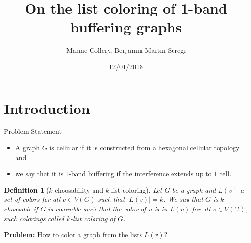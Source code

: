 \documentclass{beamer}
\title[Final Seminar]{On the list coloring of 1-band buffering graphs}
\author{Marine Collery, Benjamin Martin Seregi}
\institute{KTH Royal Institute of Technology\\
II2202, Fall 2017, Period 1-2}
\date{12/01/2018}
\newtheorem{defi}[lem]{Definition}
\begin{document}
\begin{frame}
  \titlepage
\end{frame}

\section{Introduction}

\begin{frame}{Problem Statement}

\justifying
\begin{itemize}
\item A graph $G$ is cellular if it is constructed from a hexagonal cellular topology and
\pause \item we say that it is $1$-band buffering if the interference extends up to $1$ cell.
\end{itemize}
\pause \begin{defi}[$k$-choosability and $k$-list coloring]
Let $G$ be a graph and $L(v)$ a set of colors for all $v \in V(G)$ such that $|L(v)|=k$. We say that $G$ is $k$\textit{-choosable} if $G$ is colorable such that the color of $v$ is in $L(v)$ for all $v \in V(G)$, such colorings called $k$\textit{-list coloring} of $G$.
\pause
\end{defi}
\textbf{Problem:} How to color a graph from the lists $L(v)?$
\end{frame}
\end{document}
